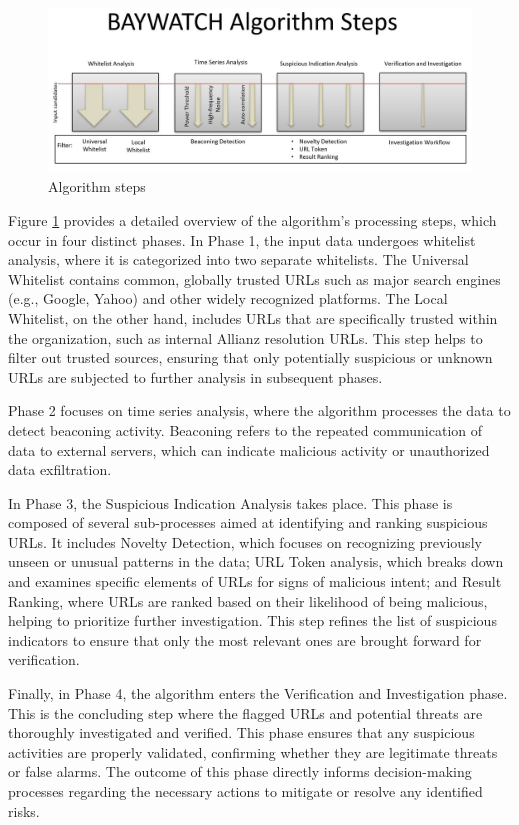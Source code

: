 \begin{figure}
    \centering
    \includegraphics[width=\textwidth]{../Thesis_Docs/media/algorithm.jpg}
    \caption{Algorithm steps}
    \label{fig:steps}
\end{figure}

Figure \ref{fig:steps} provides a detailed overview of the algorithm's processing steps, which occur in four distinct phases. In Phase 1, the input data undergoes whitelist analysis, where it is categorized into two separate whitelists. The Universal Whitelist contains common, globally trusted URLs such as major search engines (e.g., Google, Yahoo) and other widely recognized platforms. The Local Whitelist, on the other hand, includes URLs that are specifically trusted within the organization, such as internal Allianz resolution URLs. This step helps to filter out trusted sources, ensuring that only potentially suspicious or unknown URLs are subjected to further analysis in subsequent phases.

Phase 2 focuses on time series analysis, where the algorithm processes the data to detect beaconing activity. Beaconing refers to the repeated communication of data to external servers, which can indicate malicious activity or unauthorized data exfiltration.

In Phase 3, the Suspicious Indication Analysis takes place. This phase is composed of several sub-processes aimed at identifying and ranking suspicious URLs. It includes Novelty Detection, which focuses on recognizing previously unseen or unusual patterns in the data; URL Token analysis, which breaks down and examines specific elements of URLs for signs of malicious intent; and Result Ranking, where URLs are ranked based on their likelihood of being malicious, helping to prioritize further investigation. This step refines the list of suspicious indicators to ensure that only the most relevant ones are brought forward for verification.

Finally, in Phase 4, the algorithm enters the Verification and Investigation phase. This is the concluding step where the flagged URLs and potential threats are thoroughly investigated and verified. This phase ensures that any suspicious activities are properly validated, confirming whether they are legitimate threats or false alarms. The outcome of this phase directly informs decision-making processes regarding the necessary actions to mitigate or resolve any identified risks.

